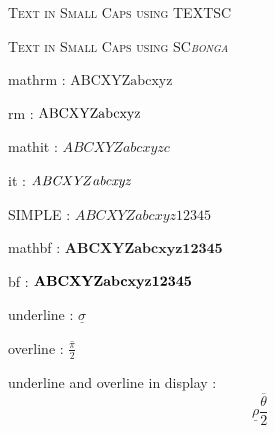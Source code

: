 \documentclass{article}
\begin{document}
\textsc{Text in Small Caps using TEXTSC}

{\scshape Text in Small Caps using SC\itshape bonga}

mathrm : $\mathrm{ABCXYZ}\mathrm{abcxyz}$

rm : ${\rm ABCXYZ}{\rm abcxyz}$

mathit : $\mathit{ABCXYZ}\mathit{abcxyzc}$

it : ${\it ABCXYZ}{\it abcxyz}$

SIMPLE : $ABCXYZabcxyz12345$





mathbf : $\mathbf{ABCXYZ}\mathbf{abcxyz}\mathbf{12345}$

bf : ${\bf ABCXYZ}{\bf abcxyz}{\bf 12345}$ 


underline : $\underline{\sigma}$

overline : $\overline{\frac{\pi}{2}}$

underline and overline in display : $$\underline{\rho} \overline{\frac{\theta}{2}}$$
\end{document}
